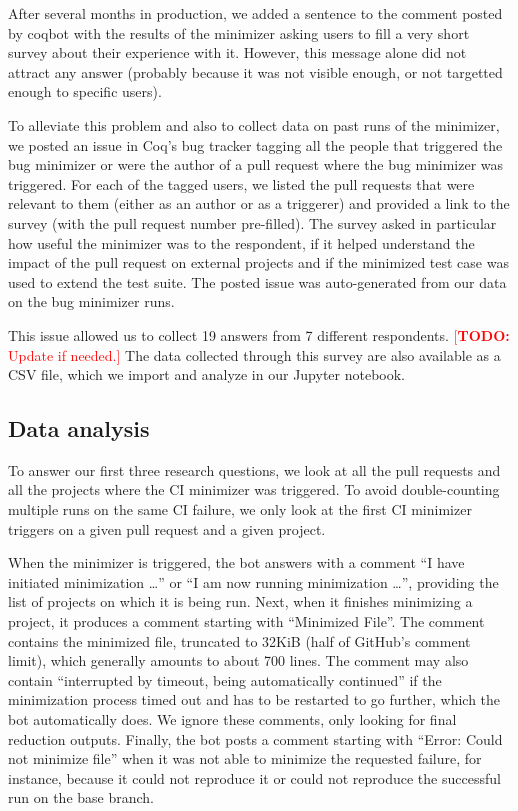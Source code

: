\documentclass[sigplan,10pt,review,anonymous]{acmart}
\makeatletter
\newcommand{\todo}[1]{%
\@latex@warning{TODO: \detokenize{#1} on page \thepage}%
\textcolor{red}{[\textbf{TODO:} #1]}}%
\makeatother
\begin{document}
After several months in production, we added a sentence to the comment posted by coqbot with the results of the minimizer asking users to fill a very short survey about their experience with it.
%
However, this message alone did not attract any answer (probably because it was not visible enough, or not targetted enough to specific users).

To alleviate this problem and also to collect data on past runs of the minimizer, we posted an issue in Coq's bug tracker tagging all the people that triggered the bug minimizer or were the author of a pull request where the bug minimizer was triggered.
%
For each of the tagged users, we listed the pull requests that were relevant to them (either as an author or as a triggerer) and provided a link to the survey (with the pull request number pre-filled).
%
The survey asked in particular how useful the minimizer was to the respondent, if it helped understand the impact of the pull request on external projects and if the minimized test case was used to extend the test suite.
%
The posted issue was auto-generated from our data on the bug minimizer runs.

This issue allowed us to collect 19 answers from 7 different respondents. \todo{Update if needed.}
%
The data collected through this survey are also available as a CSV file, which we import and analyze in our Jupyter notebook.

\subsection{Data analysis}

To answer our first three research questions, we look at all the pull requests and all the projects where the CI minimizer was triggered.
%
To avoid double-counting multiple runs on the same CI failure, we only look at the first CI minimizer triggers on a given pull request and a given project.

When the minimizer is triggered, the bot answers with a comment ``I have initiated minimization \ldots'' or ``I am now running minimization \ldots'', providing the list of projects on which it is being run.
%
Next, when it finishes minimizing a project, it produces a comment starting with ``Minimized File''.
%
The comment contains the minimized file, truncated to 32KiB (half of GitHub's comment limit), which generally amounts to about 700 lines.
%
The comment may also contain ``interrupted by timeout, being automatically continued'' if the minimization process timed out and has to be restarted to go further, which the bot automatically does.
%
We ignore these comments, only looking for final reduction outputs.
%
Finally, the bot posts a comment starting with ``Error: Could not minimize file'' when it was not able to minimize the requested failure, for instance, because it could not reproduce it or could not reproduce the successful run on the base branch.
\end{document}

